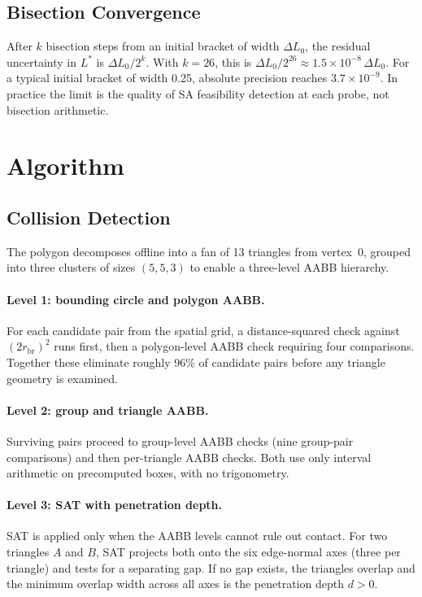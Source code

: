 \documentclass[10pt,twocolumn]{article}
\begin{document}
\subsection{Bisection Convergence}

After $k$ bisection steps from an initial bracket of width
$\Delta L_0$, the residual uncertainty in $L^*$ is
$\Delta L_0/2^k$. With $k = 26$, this is
$\Delta L_0/2^{26} \approx 1.5\times 10^{-8}\,\Delta L_0$.
For a typical initial bracket of width 0.25, absolute precision reaches
$3.7\times 10^{-9}$. In practice the limit is the quality of SA
feasibility detection at each probe, not bisection arithmetic.

\section{Algorithm}
\label{sec:algorithm}

\subsection{Collision Detection}

The polygon decomposes offline into a fan of 13 triangles from
vertex~0, grouped into three clusters of sizes $(5,5,3)$ to enable a
three-level AABB hierarchy.

\paragraph{Level 1: bounding circle and polygon AABB.}
For each candidate pair from the spatial grid, a distance-squared
check against $(2r_{\mathrm{br}})^2$ runs first, then a polygon-level
AABB check requiring four comparisons. Together these eliminate
roughly 96\% of candidate pairs before any triangle geometry is examined.

\paragraph{Level 2: group and triangle AABB.}
Surviving pairs proceed to group-level AABB checks (nine group-pair
comparisons) and then per-triangle AABB checks. Both use only interval
arithmetic on precomputed boxes, with no trigonometry.

\paragraph{Level 3: SAT with penetration depth.}
SAT is applied only when the AABB levels cannot rule out contact. For
two triangles $A$ and $B$, SAT projects both onto the six edge-normal
axes (three per triangle) and tests for a separating gap. If no gap
exists, the triangles overlap and the minimum overlap width across
all axes is the penetration depth $d > 0$.
\end{document}
